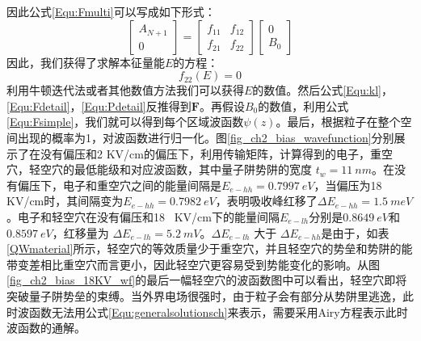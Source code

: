 因此公式\ref{Equ:Fmulti}可以写成如下形式：
\begin{equation}
\label{Equ:Fmulti_simple}
\begin{bmatrix}
A_{N+1}\\
0
\end{bmatrix} = \begin{bmatrix}
f_{11}&f_{12}\\
f_{21}&f_{22}
\end{bmatrix}
\begin{bmatrix}
0\\
B_{0}
\end{bmatrix}
\end{equation}
因此，我们获得了求解本征量能$E$的方程：
\begin{equation}
\label{Equ:sloveE}
f_{22}(E) = 0
\end{equation}
利用牛顿迭代法或者其他数值方法我们可以获得$E$的数值。然后公式\ref{Equ:kl}，\ref{Equ:Fdetail}，\ref{Equ:Pdetail}反推得到$\textbf{F}$。再假设$B_{0}$的数值，利用公式\ref{Equ:Fsimple}，我们就可以得到每个区域波函数$\psi(z)$。最后，根据粒子在整个空间出现的概率为1，对波函数进行归一化。图\ref{fig_ch2_bias_wavefunction}分别展示了在没有偏压和2 KV/cm的偏压下，利用传输矩阵，计算得到的电子，重空穴，轻空穴的最低能级和对应波函数，其中量子阱势阱的宽度 $t_w =11~nm$。在没有偏压下，电子和重空穴之间的能量间隔是$E_{e-hh} = 0.7997~eV$，当偏压为18 KV/cm时，其间隔变为$E_{e-hh} = 0.7982~eV$，表明吸收峰红移了$\Delta E_{e-hh} = 1.5~meV$。电子和轻空穴在没有偏压和18 ~KV/cm下的能量间隔$E_{e-lh}$分别是$0.8649~eV$和$0.8597~eV$，红移量为 $\Delta E_{e-lh} = 5.2~ mV$。$\Delta E_{e-lh}$ 大于 $\Delta E_{e-hh}$是由于，如表\ref{QWmaterial}所示，轻空穴的等效质量少于重空穴，并且轻空穴的势垒和势阱的能带变差相比重空穴而言更小，因此轻空穴更容易受到势能变化的影响。从图\ref{fig_ch2_bias_18KV_wf}的最后一幅轻空穴的波函数图中可以看出，轻空穴即将突破量子阱势垒的束缚。当外界电场很强时，由于粒子会有部分从势阱里逃逸，此时波函数无法用公式\ref{Equ:generalsolutionsch}来表示，需要采用Airy方程表示此时波函数的通解\cite{chuang1991exciton}。

